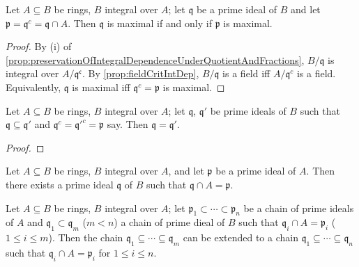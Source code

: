 \begin{corollary}
  Let \( A \subseteq B \) be rings, \( B \) integral over  \( A \); let  \( \mathfrak{q} \) be a prime ideal of \( B \) and let  \( \mathfrak{p} = \mathfrak{q}^c = \mathfrak{q} \cap A \). Then \( \mathfrak{q} \) is maximal if and only if \( \mathfrak{p} \) is maximal.
\end{corollary}
\begin{proof}
  By (i) of \autoref{prop:preservationOfIntegralDependenceUnderQuotientAndFractions}, \( B / \mathfrak{q} \) is integral over \( A / \mathfrak{q^c} \). By \autoref{prop:fieldCritIntDep}, \( B / \mathfrak{q} \) is a field iff \( A / \mathfrak{q}^c \) is a field. Equivalently,  \( \mathfrak{q} \) is maximal iff \( \mathfrak{q}^c = \mathfrak{p} \) is maximal.
\end{proof}
\begin{corollary}
  Let \( A \subseteq B \) be rings, \( B \) integral over  \( A \); let  \( \mathfrak{q} \), \( \mathfrak{q}' \) be prime ideals of \( B \) such that  \( \mathfrak{q} \subseteq  \mathfrak{q}' \) and \( \mathfrak{q}^c = \mathfrak{q}'^c = \mathfrak{p} \) say. Then \( \mathfrak{q} = \mathfrak{q}' \).
\end{corollary}
\begin{proof}
  
\end{proof}
\begin{theorem}
  Let \( A \subseteq B \) be rings, \( B \) integral over  \( A \), and let  \( \mathfrak{p} \) be a prime ideal of \( A \). Then there exists a prime ideal  \( \mathfrak{q} \) of \( B \) such that  \( \mathfrak{q} \cap A = \mathfrak{p} \).
\end{theorem}
\begin{theorem}
  Let \( A \subseteq B \) be rings, \( B \) integral over  \( A \); let  \( \mathfrak{p}_1 \subset \cdots \subset \mathfrak{p}_n \) be a chain of prime ideals of \( A \) and  \( \mathfrak{q}_1 \subset \mathfrak{q}_m \) (\( m < n \)) a chain of prime dieal of \( B \) such that  \( \mathfrak{q}_i \cap A = \mathfrak{p}_i \) (\( 1 \le i \le m \)). Then the chain \( \mathfrak{q}_1 \subseteq \cdots \subseteq \mathfrak{q}_m \) can be extended to a chain \( \mathfrak{q}_1 \subseteq \cdots \subseteq \mathfrak{q}_n \) such that \( \mathfrak{q}_i \cap A = \mathfrak{p}_i \) for \( 1 \le i \le n \).
\end{theorem}
